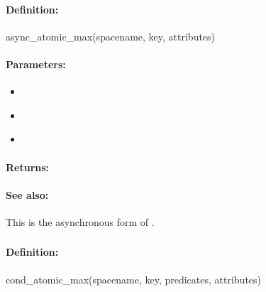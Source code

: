\paragraph{Definition:}
\begin{rubycode}
async_atomic_max(spacename, key, attributes)
\end{rubycode}

\paragraph{Parameters:}
\begin{itemize}[noitemsep]
\item {}\\

\item {}\\

\item {}\\

\end{itemize}

\paragraph{Returns:}


\paragraph{See also:}  This is the asynchronous form of .

\pagebreak
\subsubsection{}
\label{api:ruby:cond_atomic_max}


\paragraph{Definition:}
\begin{rubycode}
cond_atomic_max(spacename, key, predicates, attributes)
\end{rubycode}

